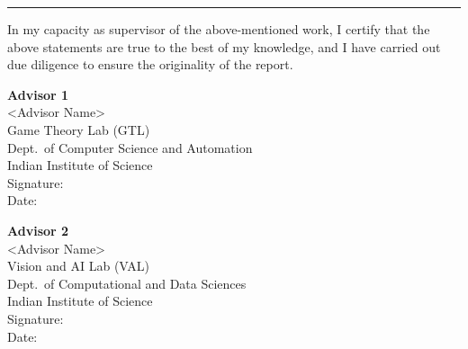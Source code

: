 \vspace{4mm}
\noindent\hrule
\vspace{4mm}

\noindent
In my capacity as supervisor of the above-mentioned work, I certify that
the above statements are true to the best of my knowledge, and I have
carried out due diligence to ensure the originality of the report.

\vspace{6mm}

\noindent
\begin{minipage}[t]{0.47\textwidth}
  \footnotesize
  \textbf{Advisor 1}\\[1mm]
  <Advisor Name>\\
  Game Theory Lab (GTL)\\
  Dept.\ of Computer Science and Automation\\
  Indian Institute of Science\\[5mm]
  Signature:~\underline{\hspace{35mm}}\\[3mm]
  Date:~\underline{\hspace{28mm}}
\end{minipage}
\hfill
\begin{minipage}[t]{0.47\textwidth}
  \footnotesize
  \textbf{Advisor 2}\\[1mm]
  <Advisor Name>\\
  Vision and AI Lab (VAL)\\
  Dept.\ of Computational and Data Sciences\\
  Indian Institute of Science\\[5mm]
  Signature:~\underline{\hspace{35mm}}\\[3mm]
  Date:~\underline{\hspace{28mm}}
\end{minipage}

\normalsize
